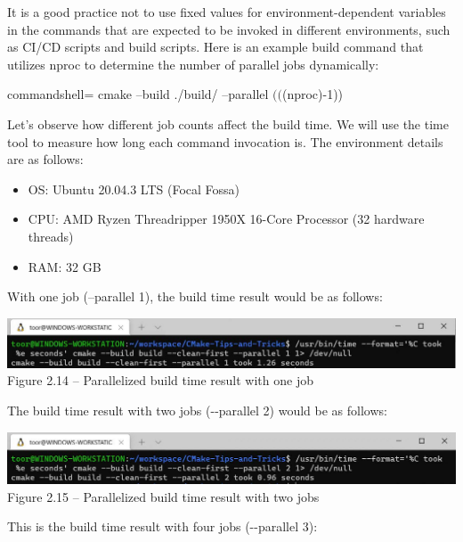 It is a good practice not to use fixed values for environment-dependent variables in the commands that are expected to be invoked in different environments, such as CI/CD scripts and build scripts. Here is an example build command that utilizes nproc to determine the number of parallel jobs dynamically:

\begin{tcblisting}{commandshell={}}
cmake --build ./build/ --parallel $(($(nproc)-1))
\end{tcblisting}

Let's observe how different job counts affect the build time. We will use the time tool to measure how long each command invocation is. The environment details are as follows:

\begin{itemize}
\item 
OS: Ubuntu 20.04.3 LTS (Focal Fossa)

\item 
CPU: AMD Ryzen Threadripper 1950X 16-Core Processor (32 hardware threads)

\item 
RAM: 32 GB
\end{itemize}

With one job (--parallel 1), the build time result would be as follows:

\begin{center}
\includegraphics[width=1.\textwidth]{content/1/chapter2/images/14.jpg}\\
Figure 2.14 – Parallelized build time result with one job
\end{center}

The build time result with two jobs (-{}-parallel 2) would be as follows:

\begin{center}
\includegraphics[width=1.\textwidth]{content/1/chapter2/images/15.jpg}\\
Figure 2.15 – Parallelized build time result with two jobs
\end{center}

This is the build time result with four jobs (-{}-parallel 3):

